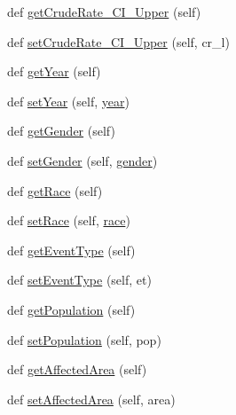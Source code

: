\begin{DoxyCompactItemize}
\item 
def \hyperlink{class_cancer_incidence_1_1_cancer_incidence_ab1fe4d09048943cca049a54ab78555ff}{get\+Crude\+Rate\+\_\+\+C\+I\+\_\+\+Upper} (self)
\item 
def \hyperlink{class_cancer_incidence_1_1_cancer_incidence_a73a869d9fe2fc5204955b209e32cc95b}{set\+Crude\+Rate\+\_\+\+C\+I\+\_\+\+Upper} (self, cr\+\_\+l)
\item 
def \hyperlink{class_cancer_incidence_1_1_cancer_incidence_a2b4025524c97ab72835a0b768000b0ad}{get\+Year} (self)
\item 
def \hyperlink{class_cancer_incidence_1_1_cancer_incidence_a4f9224921e9b4db7f088a6106f8a8f7e}{set\+Year} (self, \hyperlink{class_cancer_incidence_1_1_cancer_incidence_ad3ebc04a77307ff150f2d6f0f95b3de7}{year})
\item 
def \hyperlink{class_cancer_incidence_1_1_cancer_incidence_adf68d56c535f187e9268fcab4a871c2f}{get\+Gender} (self)
\item 
def \hyperlink{class_cancer_incidence_1_1_cancer_incidence_ab8332b3081a15fedaa892dd1735e6260}{set\+Gender} (self, \hyperlink{class_cancer_incidence_1_1_cancer_incidence_ad8f6e9c194bed1ced8a6ce0f8e1678f0}{gender})
\item 
def \hyperlink{class_cancer_incidence_1_1_cancer_incidence_a83c1c0dc576c66fa450f2f1346760715}{get\+Race} (self)
\item 
def \hyperlink{class_cancer_incidence_1_1_cancer_incidence_ab52a637061d5530a27cc5c3e5af251c1}{set\+Race} (self, \hyperlink{class_cancer_incidence_1_1_cancer_incidence_aabf2d41cf0000d41fb135b2801b35334}{race})
\item 
def \hyperlink{class_cancer_incidence_1_1_cancer_incidence_ae6237eeb2c52e3593a230ba3947d39e6}{get\+Event\+Type} (self)
\item 
def \hyperlink{class_cancer_incidence_1_1_cancer_incidence_a10236a59ed482edb0febff96cedeb686}{set\+Event\+Type} (self, et)
\item 
def \hyperlink{class_cancer_incidence_1_1_cancer_incidence_a20e27155f5454c7877cb20a99bfc8770}{get\+Population} (self)
\item 
def \hyperlink{class_cancer_incidence_1_1_cancer_incidence_aac5268c0c943e895e423dc973e5c365e}{set\+Population} (self, pop)
\item 
def \hyperlink{class_cancer_incidence_1_1_cancer_incidence_ac4b3c0aabba84934bea6cc8bad7738f3}{get\+Affected\+Area} (self)
\item 
def \hyperlink{class_cancer_incidence_1_1_cancer_incidence_a5b493f09514dc25126b3692dfb4f72c6}{set\+Affected\+Area} (self, area)

\end{DoxyCompactItemize}
